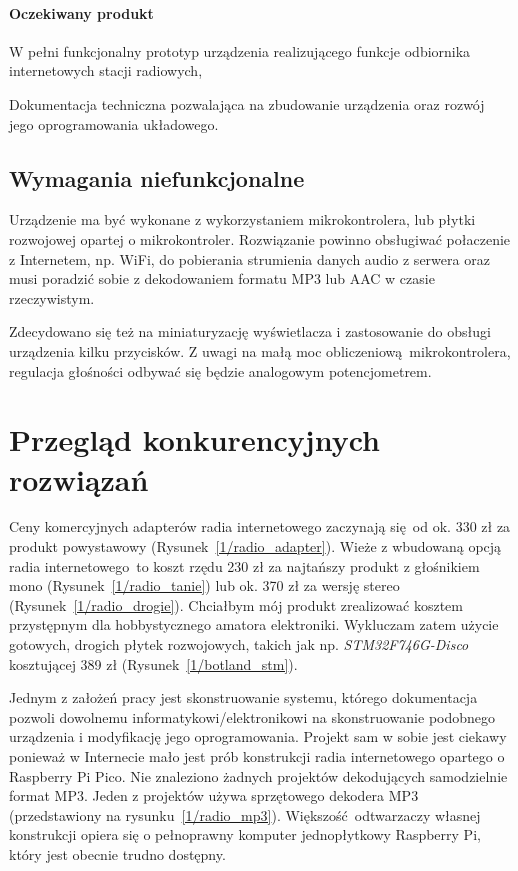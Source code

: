 \documentclass[12pt]{report}
\let\tempone\itemize
\let\temptwo\enditemize
\renewenvironment{itemize}{\tempone\setlength{\itemsep}{0cm}}{\temptwo}
\begin{document}
			\paragraph{Oczekiwany produkt}
			\begin{itemize}
				\item W pełni funkcjonalny prototyp urządzenia realizującego funkcje odbiornika internetowych stacji radiowych,
				\item Dokumentacja techniczna pozwalająca na zbudowanie urządzenia oraz rozwój jego oprogramowania układowego.
			\end{itemize}
		
		\subsection{Wymagania niefunkcjonalne}
			Urządzenie ma być wykonane z wykorzystaniem mikrokontrolera, lub płytki rozwojowej opartej o mikrokontroler. Rozwiązanie powinno obsługiwać połaczenie z Internetem, np. WiFi, do pobierania strumienia danych audio z serwera oraz musi poradzić sobie z dekodowaniem formatu MP3 lub AAC w czasie rzeczywistym.
			
			Zdecydowano się też na miniaturyzację wyświetlacza i zastosowanie do obsługi urządzenia kilku przycisków. Z uwagi na małą moc obliczeniową mikrokontrolera, regulacja głośności odbywać się będzie analogowym potencjometrem.
		
	\section{Przegląd konkurencyjnych rozwiązań}
		Ceny komercyjnych adapterów radia internetowego zaczynają się od ok. 330 zł za produkt powystawowy (Rysunek~\ref{1/radio_adapter}). Wieże z wbudowaną opcją radia internetowego to koszt rzędu 230 zł za najtańszy produkt z głośnikiem mono (Rysunek~\ref{1/radio_tanie}) lub ok. 370 zł za wersję stereo (Rysunek~\ref{1/radio_drogie}). Chciałbym mój produkt zrealizować kosztem przystępnym dla hobbystycznego amatora elektroniki. Wykluczam zatem użycie gotowych, drogich płytek rozwojowych, takich jak np. \textit{STM32F746G-Disco} kosztującej 389 zł (Rysunek~\ref{1/botland_stm}).
		
		Jednym z założeń pracy jest skonstruowanie systemu, którego dokumentacja pozwoli dowolnemu informatykowi/elektronikowi na skonstruowanie podobnego urządzenia i modyfikację jego oprogramowania. Projekt sam w sobie jest ciekawy ponieważ w Internecie mało jest prób konstrukcji radia internetowego opartego o Raspberry Pi Pico. Nie znaleziono żadnych projektów dekodujących samodzielnie format MP3.  Jeden z projektów\textsuperscript{\cite{radio_pico1}} używa sprzętowego dekodera MP3 (przedstawiony na rysunku~\ref{1/radio_mp3}). Większość odtwarzaczy własnej konstrukcji opiera się o pełnoprawny komputer jednopłytkowy Raspberry Pi, który jest obecnie trudno dostępny.
		
\end{document}
